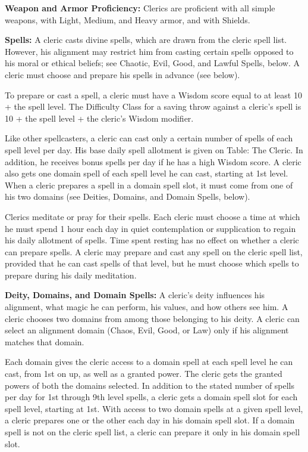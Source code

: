 \classfeatures

\textbf{Weapon and Armor Proficiency:} Clerics are proficient with all simple weapons, with Light, Medium, and Heavy armor, and with Shields.

\textbf{Spells:} A cleric casts divine spells, which are drawn from the cleric spell list. However, his alignment may restrict him from casting certain spells opposed to his moral or ethical beliefs; see Chaotic, Evil, Good, and Lawful Spells, below. A cleric must choose and prepare his spells in advance (see below).

To prepare or cast a spell, a cleric must have a Wisdom score equal to at least 10 + the spell level. The Difficulty Class for a saving throw against a cleric's spell is 10 + the spell level + the cleric's Wisdom modifier.

Like other spellcasters, a cleric can cast only a certain number of spells of each spell level per day. His base daily spell allotment is given on Table: The Cleric. In addition, he receives bonus spells per day if he has a high Wisdom score. A cleric also gets one domain spell of each spell level he can cast, starting at 1st level. When a cleric prepares a spell in a domain spell slot, it must come from one of his two domains (see Deities, Domains, and Domain Spells, below).

Clerics meditate or pray for their spells. Each cleric must choose a time at which he must spend 1 hour each day in quiet contemplation or supplication to regain his daily allotment of spells. Time spent resting has no effect on whether a cleric can prepare spells. A cleric may prepare and cast any spell on the cleric spell list, provided that he can cast spells of that level, but he must choose which spells to prepare during his daily meditation.

\textbf{Deity, Domains, and Domain Spells:} A cleric's deity influences his alignment, what magic he can perform, his values, and how others see him. A cleric chooses two domains from among those belonging to his deity. A cleric can select an alignment domain (Chaos, Evil, Good, or Law) only if his alignment matches that domain.

Each domain gives the cleric access to a domain spell at each spell level he can cast, from 1st on up, as well as a granted power. The cleric gets the granted powers of both the domains selected. In addition to the stated number of spells per day for 1st through 9th level spells, a cleric gets a domain spell slot for each spell level, starting at 1st. With access to two domain spells at a given spell level, a cleric prepares one or the other each day in his domain spell slot. If a domain spell is not on the cleric spell list, a cleric can prepare it only in his domain spell slot.


